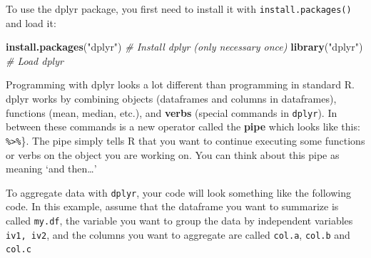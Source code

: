 \documentclass[]{book}
\newenvironment{Shaded}{\begin{snugshade}}{\end{snugshade}}
\newcommand{\KeywordTok}[1]{\textcolor[rgb]{0.13,0.29,0.53}{\textbf{{#1}}}}
\newcommand{\DataTypeTok}[1]{\textcolor[rgb]{0.13,0.29,0.53}{{#1}}}
\newcommand{\DecValTok}[1]{\textcolor[rgb]{0.00,0.00,0.81}{{#1}}}
\newcommand{\StringTok}[1]{\textcolor[rgb]{0.31,0.60,0.02}{{#1}}}
\newcommand{\CommentTok}[1]{\textcolor[rgb]{0.56,0.35,0.01}{\textit{{#1}}}}
\newcommand{\NormalTok}[1]{{#1}}
\theoremstyle{definition}
\theoremstyle{definition}
\theoremstyle{remark}
\begin{document}
To use the dplyr package, you first need to install it with
\texttt{install.packages()} and load it:

\begin{Shaded}
\begin{Highlighting}[]
\KeywordTok{install.packages}\NormalTok{(}\StringTok{"dplyr"}\NormalTok{)     }\CommentTok{# Install dplyr (only necessary once)}
\KeywordTok{library}\NormalTok{(}\StringTok{"dplyr"}\NormalTok{)              }\CommentTok{# Load dplyr}
\end{Highlighting}
\end{Shaded}

Programming with dplyr looks a lot different than programming in
standard R. dplyr works by combining objects (dataframes and columns in
dataframes), functions (mean, median, etc.), and \textbf{verbs} (special
commands in \texttt{dplyr}). In between these commands is a new operator
called the \textbf{pipe} which looks like this:
\texttt{\%\textgreater{}\%}\}. The pipe simply tells R that you want to
continue executing some functions or verbs on the object you are working
on. You can think about this pipe as meaning `and then\ldots{}'

To aggregate data with \texttt{dplyr}, your code will look something
like the following code. In this example, assume that the dataframe you
want to summarize is called \texttt{my.df}, the variable you want to
group the data by independent variables \texttt{iv1,\ iv2}, and the
columns you want to aggregate are called \texttt{col.a}, \texttt{col.b}
and \texttt{col.c}

\begin{Shaded}
\end{Shaded}
\end{document}
